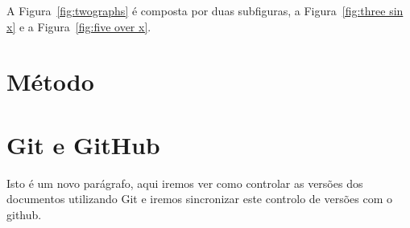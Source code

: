 \documentclass[11pt, a4paper]{article}
\begin{document}
    A Figura~\ref{fig:twographs} é composta por duas subfiguras, a Figura~\ref{fig:three sin x} e a Figura~\ref{fig:five over x}.

    \pagebreak

    \section{Método}\label{sec:metodo}

    \lipsum[6-7]

    \section{Git e GitHub}\label{sec:outrometodo}

    Isto é um novo parágrafo, aqui iremos ver como controlar as versões dos documentos utilizando Git e iremos sincronizar este controlo de versões com o github.

%    
%    
\end{document}

